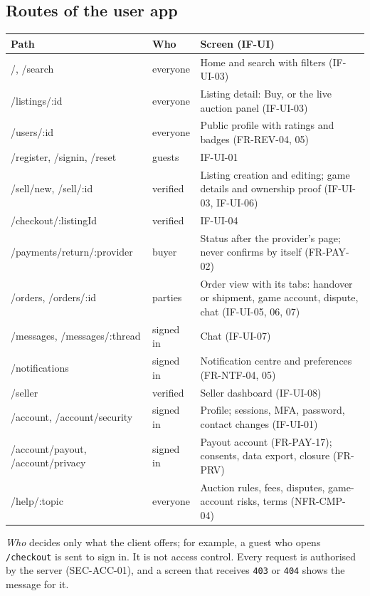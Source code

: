 \documentclass[11pt,a4paper]{article}
\newenvironment{dtable}[1]{\small\begin{longtable}{#1}}{\end{longtable}}
\begin{document}
\subsection{Routes of the user app}
\label{sec:routes}
\begin{dtable}{@{}>{\ttfamily\raggedright\arraybackslash}p{4.6cm}>{\raggedright\arraybackslash}p{2.0cm}>{\raggedright\arraybackslash}p{8.6cm}@{}}
\toprule
\textnormal{\textbf{Path}} & \textbf{Who} & \textbf{Screen (IF-UI)} \\ \midrule \endhead
/, /search & everyone & Home and search with filters (IF-UI-03) \\
/listings/:id & everyone & Listing detail: Buy, or the live auction panel (IF-UI-03) \\
/users/:id & everyone & Public profile with ratings and badges (FR-REV-04, 05) \\
/register, /signin, /reset & guests & IF-UI-01 \\
/sell/new, /sell/:id & verified & Listing creation and editing; game details and ownership proof (IF-UI-03, IF-UI-06) \\
/checkout/:listingId & verified & IF-UI-04 \\
/payments/\allowbreak return/:provider & buyer & Status after the provider's page; never confirms by itself (FR-PAY-02) \\
/orders, /orders/:id & parties & Order view with its tabs: handover or shipment, game account, dispute, chat (IF-UI-05, 06, 07) \\
/messages, /messages/:thread & signed in & Chat (IF-UI-07) \\
/notifications & signed in & Notification centre and preferences (FR-NTF-04, 05) \\
/seller & verified & Seller dashboard (IF-UI-08) \\
/account, /account/security & signed in & Profile; sessions, MFA, password, contact changes (IF-UI-01) \\
/account/payout, /account/privacy & signed in & Payout account (FR-PAY-17); consents, data export, closure (FR-PRV) \\
/help/:topic & everyone & Auction rules, fees, disputes, game-account risks, terms (NFR-CMP-04) \\
\bottomrule
\end{dtable}
\emph{Who} decides only what the client offers; for example, a guest who opens \texttt{/checkout} is sent to sign in. It is not access control. Every request is authorised by the server (SEC-ACC-01), and a screen that receives \texttt{403} or \texttt{404} shows the message for it.
\end{document}
